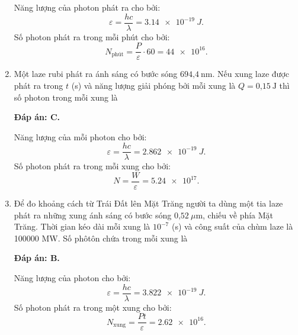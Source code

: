 \begin{enumerate}[label=\bfseries Câu \arabic*:]
{Năng lượng của photon phát ra cho bởi:
$$
	\varepsilon = \dfrac{hc}{\lambda} = \SI{3,14 e-19}{J}.
$$		
Số photon phát ra trong mỗi phút cho bởi:
$$
	N_{\text{phút}} = \dfrac{P}{\varepsilon} \cdot 60 = \num{44 e16}.
$$
		
	}
	
	\item {} 
	\cauhoi
	{Một laze rubi phát ra ánh sáng có bước sóng $\text{694,4}\ \text{nm}$. Nếu xung laze được phát ra trong $t$ (s) và năng lượng giải phóng bởi mỗi xung là $Q = \text{0,15}\ \text{J}$ thì số photon trong mỗi xung là
	}
	
	\loigiai
	{		\textbf{Đáp án: C.}
		
Năng lượng của mỗi photon cho bởi:
$$
	\varepsilon = \dfrac{hc}{\lambda} = \SI{2,862 e-19}{J}.
$$
Số photon phát ra trong mỗi xung cho bởi:
$$
	N = \dfrac{W}{\varepsilon} = \num{5,24 e17}.
$$
		
	}
	
	\item {} 
	\cauhoi
	{Để đo khoảng cách từ Trái Đất lên Mặt Trăng người ta dùng một tia laze phát ra những xung ánh sáng có bước sóng $\text{0,52}\ \mu\text{m}$, chiếu về phía Mặt Trăng. Thời gian kéo dài mỗi xung là $10^{-7}$ (s) và công suất của chùm laze là 100000 MW. Số phôtôn chứa trong mỗi xung là
	}
	
	\loigiai
	{		\textbf{Đáp án: B.}
		
Năng lượng của photon cho bởi:
$$
	\varepsilon = \dfrac{hc}{\lambda} = \SI{3,822 e-19}{J}.
$$
Số photon phát ra trong một xung cho bởi:
$$
	N_{\text{xung}} = \dfrac{Pt}{\varepsilon} = \num{2,62 e16}.
$$
		
	}
	

\end{enumerate}
